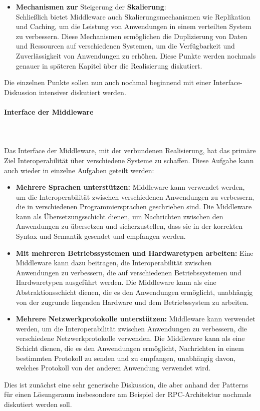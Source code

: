 \documentclass[../vs-script-first-v01.tex]{subfiles}
\begin{document}
\begin{itemize}
\item \textbf{Mechanismen zur} Steigerung der \textbf{Skalierung}:\\ Schließlich bietet Middleware auch Skalierungsmechanismen wie Replikation und Caching, um die Leistung von Anwendungen in einem verteilten System zu verbessern. Diese Mechanismen ermöglichen die Duplizierung von Daten und Ressourcen auf verschiedenen Systemen, um die Verfügbarkeit und Zuverlässigkeit von Anwendungen zu erhöhen. Diese Punkte werden nochmals genauer in späteren Kapitel über die Realisierung diskutiert.
\end{itemize}
Die einzelnen Punkte sollen nun auch nochmal beginnend mit einer Interface-Diskussion intensiver diskutiert werden.

\paragraph{Interface der Middleware}\mbox{}\\\\
Das Interface der Middleware, mit der verbundenen Realisierung, hat das primäre Ziel Interoperabilität über verschiedene Systeme zu schaffen. Diese Aufgabe kann auch wieder in einzelne Aufgaben geteilt werden: 
\begin{itemize}
\item \textbf{Mehrere Sprachen unterstützen:} Middleware kann verwendet werden, um die Interoperabilität zwischen verschiedenen Anwendungen zu verbessern, die in verschiedenen Programmiersprachen geschrieben sind. Die Middleware kann als Übersetzungsschicht dienen, um Nachrichten zwischen den Anwendungen zu übersetzen und sicherzustellen, dass sie in der korrekten Syntax und Semantik gesendet und empfangen werden.
\item \textbf{Mit mehreren Betriebssystemen und Hardwaretypen arbeiten:} Eine Middleware kann dazu beitragen, die Interoperabilität zwischen Anwendungen zu verbessern, die auf verschiedenen Betriebssystemen und Hardwaretypen ausgeführt werden. Die Middleware kann als eine Abstraktionsschicht dienen, die es den Anwendungen ermöglicht, unabhängig von der zugrunde liegenden Hardware und dem Betriebssystem zu arbeiten.
\item \textbf{Mehrere Netzwerkprotokolle unterstützen:} Middleware kann verwendet werden, um die Interoperabilität zwischen Anwendungen zu verbessern, die verschiedene Netzwerkprotokolle verwenden. Die Middleware kann als eine Schicht dienen, die es den Anwendungen ermöglicht, Nachrichten in einem bestimmten Protokoll zu senden und zu empfangen, unabhängig davon, welches Protokoll von der anderen Anwendung verwendet wird.
\end{itemize}
Dies ist zunächst eine sehr generische Diskussion, die aber anhand der Patterns für einen Lösungsraum insbesondere am Beispiel der RPC-Architektur nochmals diskutiert werden soll. 
\end{document}
